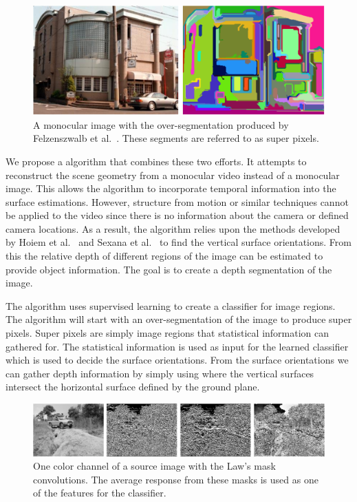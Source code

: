 \documentclass[times,10pt,twocolumn]{article}
\begin{document}
\begin{figure}[t]
  \includegraphics[keepaspectratio=true, width=\linewidth]{segment.eps}
  \caption{A monocular image with the over-segmentation produced by
           Felzenszwalb et al.~\cite{Felzen}. These segments are referred to as
           super pixels.}
  \label{fig:superpixel}
\end{figure}

We propose a algorithm that combines these two efforts. It attempts to
reconstruct the scene geometry from a monocular video instead of a monocular
image. This allows the algorithm to incorporate temporal information into the
surface estimations. However, structure from motion or similar techniques
cannot be applied to the video since there is no information about the camera
or defined camera locations. As a result, the algorithm relies upon the methods
developed by Hoiem et al.~\cite{Hoiem-05} and Sexana et al.~\cite{Sexana} to
find the vertical surface orientations. From this the relative depth of
different regions of the image can be estimated to provide object information.
The goal is to create a depth segmentation of the image.

The algorithm uses supervised learning to create a classifier for image
regions. The algorithm will start with an over-segmentation of the image to
produce super pixels. Super pixels are simply image regions that statistical
information can gathered for. The statistical information is used as input for
the learned classifier which is used to decide the surface orientations. From
the surface orientations we can gather depth information by simply using where
the vertical surfaces intersect the horizontal surface defined by the ground
plane.


\begin{figure}[t]
  \includegraphics[keepaspectratio=true, width=\textwidth]{Laws.eps}
  \caption{One color channel of a source image with the Law's mask
           convolutions. The average response from these masks is used
           as one of the features for the classifier.}
  \label{fig:lawsconv}
\end{figure}
\end{document}

